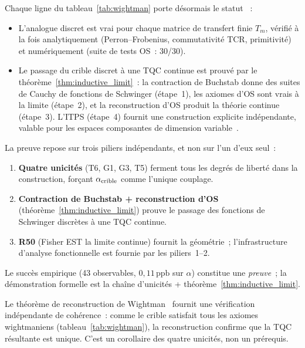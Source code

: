 \documentclass[12pt,a4paper]{article}
\begin{document}
\begin{remarque}\mBR
\label{rem:wightman_table_guide}
Chaque ligne du tableau~\ref{tab:wightman} porte désormais le
statut \THMTAG~:
\begin{itemize}[nosep]
\item L'analogue discret est vrai pour chaque matrice de transfert
  finie $T_m$, vérifié à la fois analytiquement (Perron--Frobenius,
  commutativité TCR, primitivité) et numériquement (suite de tests
  OS~: 30/30).
\item Le passage du crible discret à une TQC continue est prouvé
  par le théorème~\ref{thm:inductive_limit}~: la contraction de
  Buchstab donne des suites de Cauchy de fonctions de Schwinger
  (étape~1), les axiomes d'OS sont vrais à la limite (étape~2), et
  la reconstruction d'OS produit la théorie continue (étape~3).
  L'ITPS (étape~4) fournit une construction explicite indépendante,
  valable pour les espaces composantes de dimension
  variable~\cite{Guichardet1966,ArakiWoods1968}.
\end{itemize}
\end{remarque}

\begin{remarque}\mBR
\label{rem:wightman_not_claimed}
La preuve repose sur trois piliers indépendants, et non sur l'un
d'eux seul~:
\begin{enumerate}[nosep]
\item \textbf{Quatre unicités} (T6, G1, G3, T5) ferment tous les
  degrés de liberté dans la construction, forçant
  $\alpha_{\rm crible}$ comme l'unique couplage.
\item \textbf{Contraction de Buchstab + reconstruction d'OS}
  (théorème~\ref{thm:inductive_limit}) prouve le passage des
  fonctions de Schwinger discrètes à une TQC continue.
\item \textbf{R50} (Fisher EST la limite continue) fournit la
  géométrie~; l'infrastructure d'analyse fonctionnelle est fournie
  par les piliers~1--2.
\end{enumerate}
Le succès empirique (43 observables, $0{,}11\,\mathrm{ppb}$ sur
$\alpha$) constitue une \emph{preuve}~; la démonstration formelle
est la chaîne d'unicités + théorème~\ref{thm:inductive_limit}.

Le théorème de reconstruction de Wightman~\cite{StreaterWightman1964}
fournit une vérification indépendante de cohérence~: comme le
crible satisfait tous les axiomes wightmaniens
(tableau~\ref{tab:wightman}), la reconstruction confirme que la
TQC résultante est unique. C'est un corollaire des quatre unicités,
non un prérequis.
\end{remarque}
\end{document}
